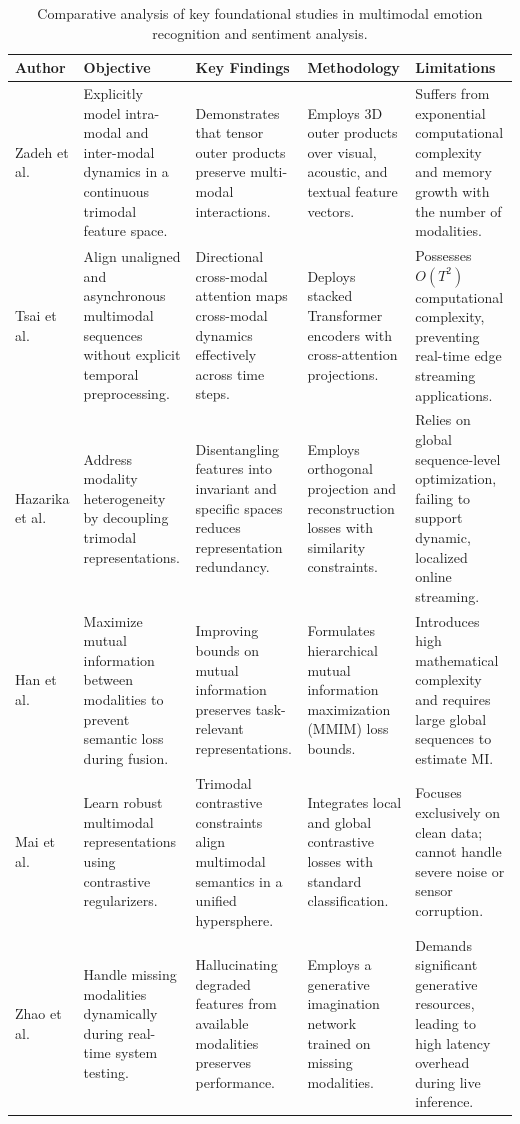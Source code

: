 \documentclass[sn-mathphys,Numbered]{sn-jnl}
\theoremstyle{thmstyleone}
\theoremstyle{thmstyletwo}
\theoremstyle{thmstylethree}
\begin{document}
\begin{table}[t]
\centering
\caption{Comparative analysis of key foundational studies in multimodal emotion recognition and sentiment analysis.}
\label{tab:lit_review_1}
\setlength{\tabcolsep}{4pt}
\renewcommand{\arraystretch}{1.3}
\scriptsize
\begin{tabular}{p{2.3cm} p{2.8cm} p{3.2cm} p{3.2cm} p{3.0cm}}
\toprule
\textbf{Author} & \textbf{Objective} & \textbf{Key Findings} & \textbf{Methodology} & \textbf{Limitations} \\
\midrule
Zadeh et al. \cite{zadeh2017tensor} & Explicitly model intra-modal and inter-modal dynamics in a continuous trimodal feature space. & Demonstrates that tensor outer products preserve multi-modal interactions. & Employs 3D outer products over visual, acoustic, and textual feature vectors. & Suffers from exponential computational complexity and memory growth with the number of modalities. \\
\midrule
Tsai et al. \cite{tsai2019multimodal} & Align unaligned and asynchronous multimodal sequences without explicit temporal preprocessing. & Directional cross-modal attention maps cross-modal dynamics effectively across time steps. & Deploys stacked Transformer encoders with cross-attention projections. & Possesses $O(T^2)$ computational complexity, preventing real-time edge streaming applications. \\
\midrule
Hazarika et al. \cite{hazarika2020misa} & Address modality heterogeneity by decoupling trimodal representations. & Disentangling features into invariant and specific spaces reduces representation redundancy. & Employs orthogonal projection and reconstruction losses with similarity constraints. & Relies on global sequence-level optimization, failing to support dynamic, localized online streaming. \\
\midrule
Han et al. \cite{han2021improving} & Maximize mutual information between modalities to prevent semantic loss during fusion. & Improving bounds on mutual information preserves task-relevant representations. & Formulates hierarchical mutual information maximization (MMIM) loss bounds. & Introduces high mathematical complexity and requires large global sequences to estimate MI. \\
\midrule
Mai et al. \cite{mai2022hybrid} & Learn robust multimodal representations using contrastive regularizers. & Trimodal contrastive constraints align multimodal semantics in a unified hypersphere. & Integrates local and global contrastive losses with standard classification. & Focuses exclusively on clean data; cannot handle severe noise or sensor corruption. \\
\midrule
Zhao et al. \cite{zhao2023missing} & Handle missing modalities dynamically during real-time system testing. & Hallucinating degraded features from available modalities preserves performance. & Employs a generative imagination network trained on missing modalities. & Demands significant generative resources, leading to high latency overhead during live inference. \\
\bottomrule
\end{tabular}
\end{table}
\end{document}
